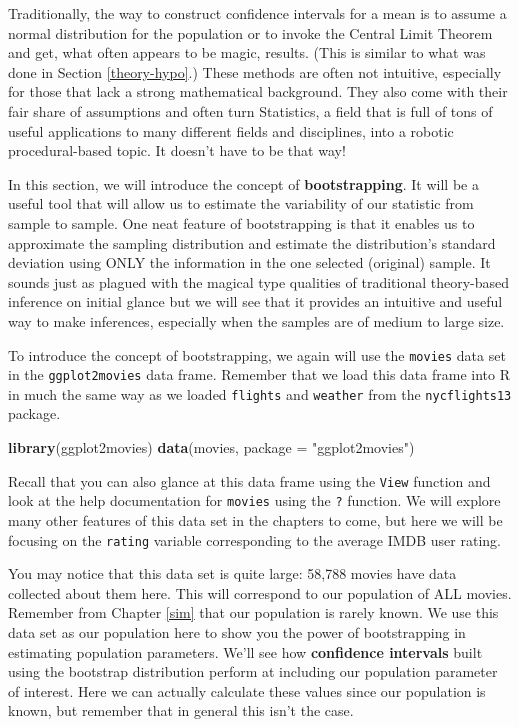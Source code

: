 \documentclass[]{tufte-book}
\newenvironment{Shaded}{\begin{snugshade}}{\end{snugshade}}
\newcommand{\KeywordTok}[1]{\textcolor[rgb]{0.13,0.29,0.53}{\textbf{{#1}}}}
\newcommand{\DataTypeTok}[1]{\textcolor[rgb]{0.13,0.29,0.53}{{#1}}}
\newcommand{\StringTok}[1]{\textcolor[rgb]{0.31,0.60,0.02}{{#1}}}
\newcommand{\NormalTok}[1]{{#1}}
\begin{document}
Traditionally, the way to construct confidence intervals for a mean is
to assume a normal distribution for the population or to invoke the
Central Limit Theorem and get, what often appears to be magic, results.
(This is similar to what was done in Section \ref{theory-hypo}.) These
methods are often not intuitive, especially for those that lack a strong
mathematical background. They also come with their fair share of
assumptions and often turn Statistics, a field that is full of tons of
useful applications to many different fields and disciplines, into a
robotic procedural-based topic. It doesn't have to be that way!

In this section, we will introduce the concept of
\textbf{bootstrapping}. It will be a useful tool that will allow us to
estimate the variability of our statistic from sample to sample. One
neat feature of bootstrapping is that it enables us to approximate the
sampling distribution and estimate the distribution's standard deviation
using ONLY the information in the one selected (original) sample. It
sounds just as plagued with the magical type qualities of traditional
theory-based inference on initial glance but we will see that it
provides an intuitive and useful way to make inferences, especially when
the samples are of medium to large size.

To introduce the concept of bootstrapping, we again will use the
\texttt{movies} data set in the \texttt{ggplot2movies} data frame.
Remember that we load this data frame into R in much the same way as we
loaded \texttt{flights} and \texttt{weather} from the
\texttt{nycflights13} package.

\begin{Shaded}
\begin{Highlighting}[]
\KeywordTok{library}\NormalTok{(ggplot2movies)}
\KeywordTok{data}\NormalTok{(movies, }\DataTypeTok{package =} \StringTok{"ggplot2movies"}\NormalTok{)}
\end{Highlighting}
\end{Shaded}

Recall that you can also glance at this data frame using the
\texttt{View} function and look at the help documentation for
\texttt{movies} using the \texttt{?} function. We will explore many
other features of this data set in the chapters to come, but here we
will be focusing on the \texttt{rating} variable corresponding to the
average IMDB user rating.

You may notice that this data set is quite large: 58,788 movies have
data collected about them here. This will correspond to our population
of ALL movies. Remember from Chapter \ref{sim} that our population is
rarely known. We use this data set as our population here to show you
the power of bootstrapping in estimating population parameters. We'll
see how \textbf{confidence intervals} built using the bootstrap
distribution perform at including our population parameter of interest.
Here we can actually calculate these values since our population is
known, but remember that in general this isn't the case.
\end{document}

